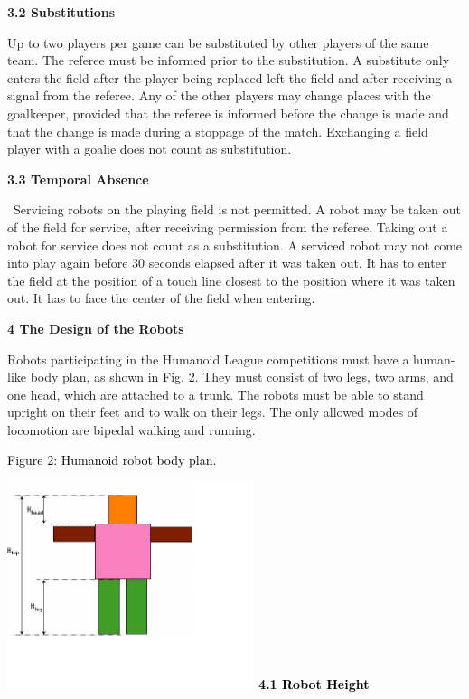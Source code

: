 \documentclass[a4paper]{article}
\begin{document}
\bigskip

\textbf{3.2 Substitutions}

Up to two players per game can be substituted by other players of the same team. The referee must be informed prior to
the substitution. A substitute only enters the field after the player being replaced left the field and after receiving
a signal from the referee. Any of the other players may change places with the goalkeeper, provided that the referee is
informed before the change is made and that the change is made during a stoppage of the match. Exchanging a field
player with a goalie does not count as substitution.

\textbf{3.3 Temporal Absence}

\ Servicing robots on the playing field is not permitted. A robot may be taken out of the field for service, after
receiving permission from the referee. Taking out a robot for service does not count as a substitution. A serviced
robot may not come into play again before 30 seconds elapsed after it was taken out. It has to enter the field at the
position of a touch line closest to the position where it was taken out. It has to face the center of the field when
entering.

\textbf{4 The Design of the Robots}

Robots participating in the Humanoid League competitions must have a human-like body plan, as shown in Fig. 2. They must
consist of two legs, two arms, and one head, which are attached to a trunk. The robots must be able to stand upright on
their feet and to walk on their legs. The only allowed modes of locomotion are bipedal walking and running.

\textcolor{black}{Figure 2: Humanoid robot body plan.}

{\centering
\includegraphics[width=7.234cm,height=6.07cm]{img/HELSI_rules_2025-img002.jpg}}
\textbf{\textcolor{black}{4.1 Robot Height}}
\end{document}
